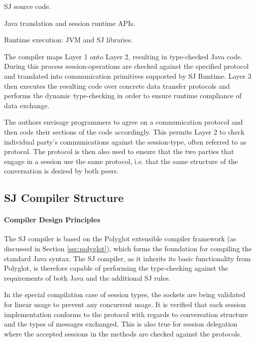\begin{packed_description}
\item[Layer 1] SJ source code.
\item[Layer 2] Java translation and session runtime APIs.
\item[Layer 3] Runtime execution: JVM and SJ libraries.
\end{packed_description}

The compiler maps Layer 1 onto Layer 2, resulting in type-checked Java code. During this process session-operations are checked against the specified protocol and translated into communication primitives supported by SJ Runtime. Layer 3 then executes the resulting code over concrete data transfer protocols and performs the dynamic type-checking in order to ensure runtime compliance of data exchange.

The authors envisage programmers to agree on a communication protocol and then code their sections of the code accordingly. This permits Layer 2 to check individual party's communications against the session-type, often referred to as protocol. The protocol is then also used to ensure that the two parties that engage in a session use the same protocol, i.e. that the same structure of the conversation is desired by both peers.


\subsection{SJ Compiler Structure}
\label{subsec:sjcomp} 

\paragraph*{Compiler Design Principles}
The SJ compiler is based on the Polyglot extensible compiler framework (as discussed in Section \ref{sec:polyglot}), which forms the foundation for compiling the standard Java syntax. The SJ compiler, as it inherits its basic functionality from Polyglot, is therefore capable of performing the type-checking against the requirements of both Java and the additional SJ rules. 

In the special compilation case of session types, the sockets are being validated for linear usage to prevent any concurrent usage. It is verified that each session implementation conforms to the protocol with regards to conversation structure and the types of messages exchanged. This is also true for session delegation where the accepted sessions in the methods are checked against the protocols.

